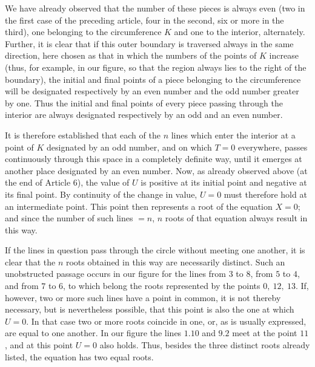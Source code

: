 We have already observed that the number of these pieces is always even (two in the first case of the preceding article, four in the second, six or more in the third), one belonging to the circumference $K$ and one to the interior, alternately. Further, it is clear that if this outer boundary is traversed always in the same direction, here chosen as that in which the numbers of the points of $K$ increase (thus, for example, in our figure, so that the region always lies to the right of the boundary), the initial and final points of a piece belonging to the circumference will be designated respectively by an even number and the odd number greater by one. Thus the initial and final points of every piece passing through the interior are always designated respectively by an odd and an even number.

It is therefore established that each of the $n$ lines which enter the interior at a point of $K$ designated by an odd number, and on which $T=0$ everywhere, passes continuously through this space in a completely definite way, until it emerges at another place designated by an even number. Now, as already observed above (at the end of Article 6), the value of $U$ is positive at its initial point and negative at its final point. By continuity of the change in value, $U=0$ must therefore hold at an intermediate point. This point then represents a root of the equation $X=0$; and since the number of such lines $=n$, $n$ roots of that equation always result in this way.


If the lines in question pass through the circle without meeting one another, it is clear that the $n$ roots obtained in this way are necessarily distinct. Such an unobstructed passage occurs in our figure for the lines from $3$ to $8$, from $5$ to $4$, and from $7$ to $6$, to which belong the roots represented by the points $0,\ 12,\ 13$. If, however, two or more such lines have a point in common, it is not thereby necessary, but is nevertheless possible, that this point is also the one at which $U=0$. In that case two or more roots coincide in one, or, as is usually expressed, are equal to one another. In our figure the lines $1.10$ and $9.2$ meet at the point $11$, and at this point $U=0$ also holds. Thus, besides the three distinct roots already listed, the equation has two equal roots.

